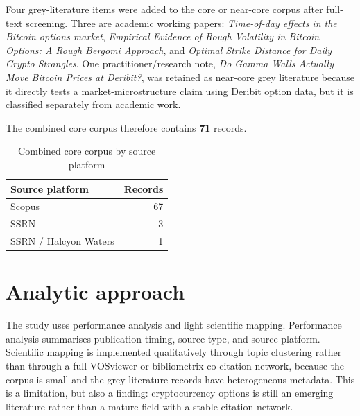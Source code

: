 \documentclass[11pt,a4paper]{article}
\begin{document}
Four grey-literature items were added to the core or near-core corpus after full-text screening. Three are academic working papers: \emph{Time-of-day effects in the Bitcoin options market}, \emph{Empirical Evidence of Rough Volatility in Bitcoin Options: A Rough Bergomi Approach}, and \emph{Optimal Strike Distance for Daily Crypto Strangles}. One practitioner/research note, \emph{Do Gamma Walls Actually Move Bitcoin Prices at Deribit?}, was retained as near-core grey literature because it directly tests a market-microstructure claim using Deribit option data, but it is classified separately from academic work.

The combined core corpus therefore contains \textbf{71} records.

\begin{table}[h!]
\centering
\caption{Combined core corpus by source platform}
\begin{tabular}{lr}
\toprule
Source platform & Records \\
\midrule
Scopus & 67 \\
SSRN & 3 \\
SSRN / Halcyon Waters & 1 \\
\bottomrule
\end{tabular}
\end{table}

\section{Analytic approach}

The study uses performance analysis and light scientific mapping. Performance analysis summarises publication timing, source type, and source platform. Scientific mapping is implemented qualitatively through topic clustering rather than through a full VOSviewer or bibliometrix co-citation network, because the corpus is small and the grey-literature records have heterogeneous metadata. This is a limitation, but also a finding: cryptocurrency options is still an emerging literature rather than a mature field with a stable citation network.
\end{document}
